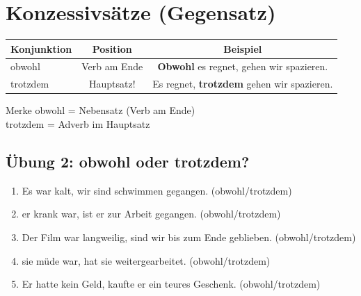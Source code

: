 
\section{Konzessivsätze (Gegensatz)}
\label{sec:B1Konzessiv}

\begin{center}
\begin{tabular}{|l|c|c|}
\hline
Konjunktion & Position & Beispiel \\ \hline
obwohl & Verb am Ende & \textbf{Obwohl} es regnet, gehen wir spazieren. \\ \hline
trotzdem & Hauptsatz! & Es regnet, \textbf{trotzdem} gehen wir spazieren. \\ \hline
\end{tabular}
\end{center}

\begin{infobox}{Merke}
obwohl = Nebensatz (Verb am Ende)\\
trotzdem = Adverb im Hauptsatz
\end{infobox}

\subsection*{Übung 2: obwohl oder trotzdem?}
\begin{enumerate}
    \item Es war kalt, \underline{\hspace{1cm}} wir sind schwimmen gegangen. (obwohl/trotzdem)
    \item \underline{\hspace{1cm}} er krank war, ist er zur Arbeit gegangen. (obwohl/trotzdem)
    \item Der Film war langweilig, \underline{\hspace{1cm}} sind wir bis zum Ende geblieben. (obwohl/trotzdem)
    \item \underline{\hspace{1cm}} sie müde war, hat sie weitergearbeitet. (obwohl/trotzdem)
    \item Er hatte kein Geld, \underline{\hspace{1cm}} kaufte er ein teures Geschenk. (obwohl/trotzdem)
\end{enumerate}

